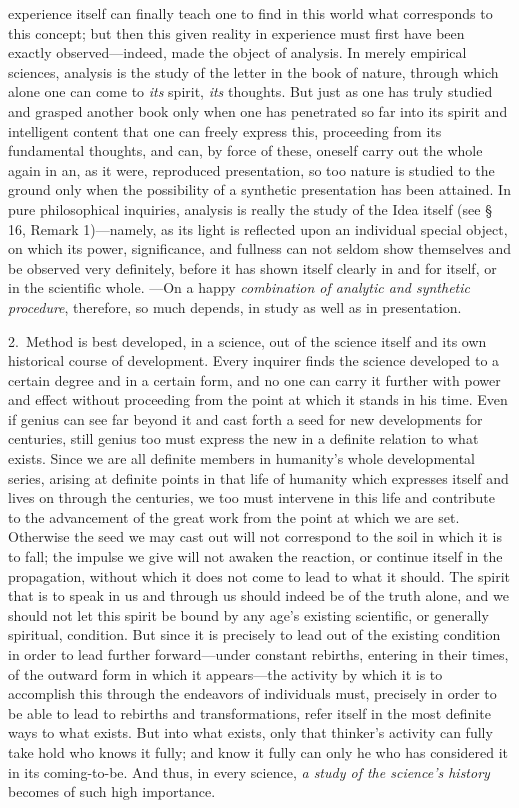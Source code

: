 \documentclass[12pt,a4paper]{book}
\begin{document}
experience itself can finally teach one to find in this world what corresponds to this
concept; but then this given reality in experience must first have been exactly
observed---indeed, made the object of analysis. In merely empirical sciences, analysis is the
study of the letter in the book of nature, through which alone one can come to \emph{its}
spirit, \emph{its} thoughts. But just as one has truly studied and grasped another book only when
one has penetrated so far into its spirit and intelligent content that one can freely express
this, proceeding from its fundamental thoughts, and can, by force of these, oneself carry out
the whole again in an, as it were, reproduced presentation, so too nature is studied to the
ground only when the possibility of a synthetic presentation has been attained. In pure
philosophical inquiries, analysis is really the study of the Idea itself (see § 16,
Remark 1)---namely, as its light is reflected upon an individual special object, on which its
power, significance, and fullness can not seldom show themselves and be observed very
definitely, before it has shown itself clearly in and for itself, or in the scientific whole.
---On a happy \emph{combination of analytic and synthetic procedure}, therefore, so much
depends, in study as well as in presentation.

2.~Method is best developed, in a science, out of the science itself and its own historical
course of development. Every inquirer finds the science developed to a certain degree and in a
certain form, and no one can carry it further with power and effect without proceeding from
the point at which it stands in his time. Even if genius can see far beyond it and cast forth
a seed for new developments for centuries, still genius too must express the new in a definite
relation to what exists. Since we are all definite members in humanity's whole developmental
series, arising at definite points in that life of humanity which expresses itself and lives
on through the centuries, we too must intervene in this life and contribute to the advancement
of the great work from the point at which we are set. Otherwise the seed we may cast out will
not correspond to the soil in which it is to fall; the impulse we give will not awaken the
reaction, or continue itself in the propagation, without which it does not come to lead to
what it should. The spirit that is to speak in us and through us should indeed be of the truth
alone, and we should not let this spirit be bound by any age's existing scientific, or
generally spiritual, condition. But since it is precisely to lead out of the existing
condition in order to lead further forward---under constant rebirths, entering in their times,
of the outward form in which it appears---the activity by which it is to accomplish this
through the endeavors of individuals must, precisely in order to be able to lead to rebirths
and transformations, refer itself in the most definite ways to what exists. But into what
exists, only that thinker's activity can fully take hold who knows it fully; and know it fully
can only he who has considered it in its coming-to-be. And thus, in every science,
\emph{a study of the science's history} becomes of such high importance.
\end{document}
